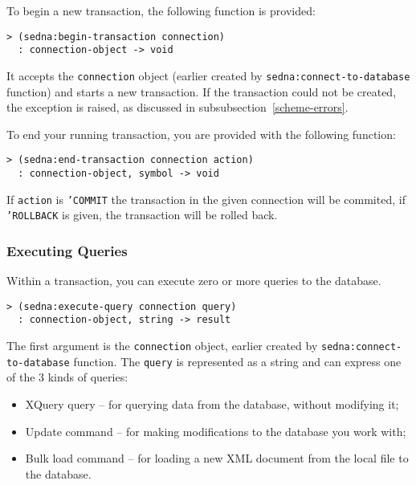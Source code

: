\documentclass[a4paper,12pt]{article}
\newtheorem{note}{Note}
\begin{document}
To begin a new transaction, the following function is provided:

\begin{verbatim}> (sedna:begin-transaction connection)
  : connection-object -> void\end{verbatim}

It accepts the \texttt{connection} object (earlier created by
\texttt{sedna:connect-to-database} function) and starts a new transaction.
If the transaction could not be created, the exception is raised, as discussed
in subsubsection~\ref{scheme-errors}.

To end your running transaction, you are provided with the following function:

\begin{verbatim}> (sedna:end-transaction connection action)
  : connection-object, symbol -> void\end{verbatim}

If \texttt{action} is \texttt{'COMMIT} the transaction in the given connection
will be commited, if \texttt{'ROLLBACK} is given, the transaction will be
rolled back.



\subsubsection{Executing Queries}

Within a transaction, you can execute zero or more queries to the database.

\begin{verbatim}> (sedna:execute-query connection query)
  : connection-object, string -> result\end{verbatim}

The first argument is the \texttt{connection} object, earlier created by
\texttt{sedna:connect-to-database} function.
The \texttt{query} is represented as a string and can express one of the 3
kinds of queries:
\begin{itemize}
\item XQuery query -- for querying data from the database, without modifying it;
\item Update command -- for making modifications to the database you work
 with;
\item Bulk load command -- for loading a new XML document from the local file to the
 database.
\end{itemize}
\end{document}
